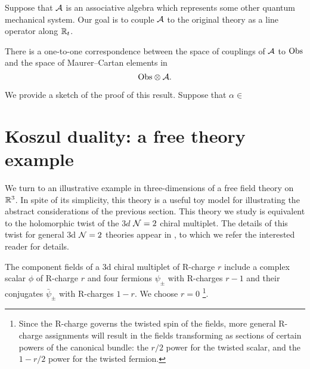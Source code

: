 \documentclass[11pt]{amsart}
\def\brian#1{{\textcolor{blue!65!red}{BRW: {#1}}}}
\begin{document}
Suppose that $\mathcal A$ is an associative algebra which represents some other quantum mechanical system. 
Our goal is to couple $\mathcal A$ to the original theory as a line operator along $\mathbb R_t$. 

\begin{prop}\label{prop:line}
There is a one-to-one correspondence between the space of couplings of $\mathcal A$ to ${\rm Obs}$ and the space of Maurer--Cartan elements in 
\[
{\rm Obs} \otimes \mathcal A .
\]
\end{prop}

We provide a sketch of the proof of this result. 
Suppose that $\alpha \in $



\section{Koszul duality: a free theory example}


We turn to an illustrative example in three-dimensions of a free field theory on $\mathbb R^3$. In spite of its simplicity, this theory is a useful toy model for illustrating the abstract considerations of the previous section. 
This theory we study is equivalent to the holomorphic twist of the $3d$ $\mathcal N=2$ chiral multiplet. The details of this twist for general 3d $\mathcal N=2$ theories appear in \cite{CDG20}, to which we refer the interested reader for details. 

The component fields of a 3d chiral multiplet of R-charge $r$ include a complex scalar $\phi$ of R-charge $r$ and four fermions $\psi_{\pm}$ with R-charges  $r-1$ and their conjugates $\bar{\psi}_{\pm}$ with R-charges $1-r$. We choose $r=0$ \footnote{Since the R-charge governs the twisted spin of the fields, more general R-charge assignments will result in the fields transforming as sections of certain powers of the canonical bundle: the $r/2$ power for the twisted scalar, and the $1-r/2$ power for the twisted fermion.}.  
\end{document}
